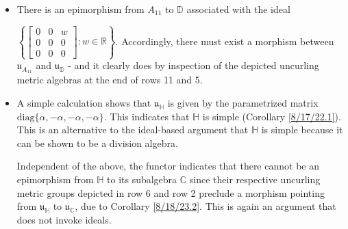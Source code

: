 \documentclass{amsart}
\numberwithin{equation}{section}
\theoremstyle{definition}
\numberwithin{theorem}{section}
\begin{document}
\begin{itemize}
 $\left\{\left[\begin{array}{ccc}
0  & 0 & w   \\
 0 & 0 & v \\
 0 & 0 & 0    
\end{array}\right]:w,v\in\mathbb{R}\right\}$.
The functor then implies that there must exist a morphism from $\mathfrak{u}_{A_{12}}$ to $\mathfrak{u}_{\mathbb{D}}$.  Indeed, existence of the latter morphism is obvious from the last entries in rows 12 and 5 of Table I. 
 \item There is an epimorphism from $A_{11}$ to $\mathbb{D}$ associated with the ideal 
 
 $ \left\{\left[\begin{array}{ccc}
0  & 0 & w   \\
 0 & 0 & 0 \\
 0 & 0 & 0    
\end{array}\right]:w\in\mathbb{R} \right\} $. Accordingly, there must exist a morphism between $\mathfrak{u}_{A_{11}}$ and $\mathfrak{u}_{\mathbb{D}}$  - and it clearly does by inspection of the depicted uncurling metric algebras at the end of rows 11 and 5.  
 \item A simple calculation shows that $\mathfrak{u}_{\mathbb{H}}$ is given by the parametrized matrix $\text{diag}\{\alpha,-\alpha,-\alpha,-\alpha\}$.  This indicates that  $\mathbb{H}$ is simple (Corollary \ref{8/17/22.1}).  This is an alternative to the ideal-based argument that $\mathbb{H}$ is simple because it can be shown to be a division algebra.

 Independent of the above, the functor indicates that there cannot be an epimorphism from  $\mathbb{H}$ to its subalgebra $\mathbb{C}$ since 	their respective uncurling metric groups depicted in row 6 and row 2 preclude a morphism pointing from $\mathfrak{u}_{\mathbb{H}}$ to $\mathfrak{u}_{\mathbb{C}}$, due to Corollary \ref{8/18/23.2}.  This is again an argument that does not invoke ideals.
 \end{itemize}
 
\end{document}
